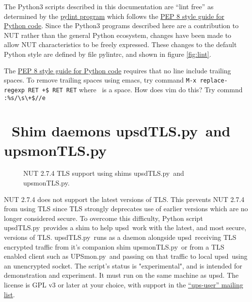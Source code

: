 \documentclass[12pt]{article}
\newlength{\headersep}\setlength{\headersep}{3mm}
\newcommand{\Hsep}{\hspace{\headersep}}
\newcommand{\newcolumn}{\vfill\eject}
\newcommand{\upsd}{\mbox{\textcolor{UPSDCOLOUR}{upsd}}}
\newcommand{\upsdTLS}{\mbox{\textcolor{UPSDCOLOUR}{upsdTLS.py}}}
\newcommand{\upsmonTLS}{\mbox{\textcolor{UPSMONCOLOUR}{upsmonTLS.py}}}
\newcommand{\UPSmon}{\mbox{\textcolor{UPSMONCOLOUR}{UPSmon.py}}}
\newcommand{\pylintrc}{\mbox{\textcolor{NUTCOLOUR}{pylintrc}}}
\newcommand{\mailinglist}{\href{https://lists.alioth.debian.org/mailman/listinfo/nut-upsuser}%
                               {``ups-user'' mailing list}}
\begin{document}
The Python3 scripts described in this documentation are ``lint free'' as
determined by the \href{https://www.pylint.org/}{pylint program} which follows
the \href{https://www.python.org/dev/peps/pep-0008/}{PEP 8 style guide for
  Python code}.  Since the Python3 programs described here are a contribution
to NUT rather than the general Python ecosystem, changes have been made to
allow NUT characteristics to be freely expressed.  These changes to the
default Python style are defined by file \pylintrc, and shown in figure
\ref{fig:lint}.

The \href{https://www.python.org/dev/peps/pep-0008/}{PEP 8 style guide for
  Python code} requires that no line include trailing spaces.  To remove
trailing spaces using emacs, try command
\verb`M-x replace-regexp RET `\textvisiblespace\verb`+$ RET RET`
where \textvisiblespace\ is a space.  How does vim do this?
Try commnd \verb`:%s/\s\+$//e`



\vspace*{\fill}

\section{\Hsep\ Shim daemons \upsdTLS\ and \upsmonTLS}\label{section:upsdTLS}

\begin{figure}[ht]
\vspace{-6mm}
\begin{center}
\end{center}
\vspace{-6mm}
\caption{NUT 2.7.4 TLS support using shims \upsdTLS\ and \upsmonTLS.\label{fig:upsdTLS}}
\end{figure}

NUT 2.7.4 does not support the latest versions of TLS.  This prevents NUT
2.7.4 from using TLS since TLS strongly deprecates use of earlier versions
which are no longer considered secure.  To overcome this difficulty, Python
script \upsdTLS\ provides a shim to help \upsd\ work with the latest, and most
secure, versions of TLS.  \upsdTLS\ runs as a daemon alongside
\upsd\ receiving TLS encrypted traffic from it's companion shim \upsmonTLS\ or
from a TLS enabled client such as \UPSmon\ and passing on that traffic to
local \upsd\ using an unencrypted socket.  The script's status is
"experimental", and is intended for demonstration and experiment.  It must run
on the same machine as \upsd.  The license is GPL v3 or later at your choice,
with support in the \mailinglist.
\end{document}
